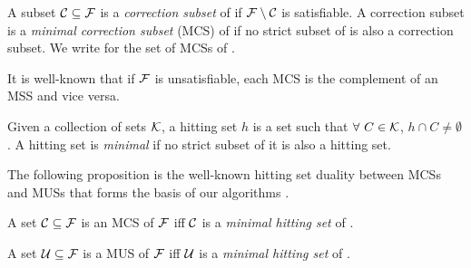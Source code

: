 \begin{definition}
    A subset $\mathcal{C} \subseteq \mathcal{F} $ is a \emph{correction subset} of \formula if $\mathcal{F} \setminus\mathcal{C}$ is satisfiable. 
    A correction subset  is a \emph{minimal correction subset} (MCS)  of \formula if no strict subset of  is also a correction subset. 
    We write \mcses{\F} for the set of MCSs of \F. 
\end{definition}

It is well-known that if $\mathcal{F} $ is unsatisfiable, each  MCS is the complement of an MSS and vice versa. 

\begin{definition}\label{def:minimal-hs}
    Given a collection of sets $\mathcal{K}$, a hitting set $h$ is a set such that $\forall \ C \in \mathcal{K}$, $h \cap C \neq \emptyset$. A hitting set is \emph{minimal} if no strict subset of it is also a hitting set. 
\end{definition}



The following proposition is the well-known hitting set duality  between MCSs and MUSs that forms the basis of our algorithms \cite{DBLP:journals/jar/LiffitonS08,ai/Reiter87}.

\begin{proposition}\label{prop:MCS-MUS-hittingset}
%     
    A set  $\mathcal{C} \subseteq \mathcal{F} $ is an MCS of $ \mathcal{F} $ iff  $\mathcal{C}$ is a \emph{minimal hitting set} of .

    A set  $\mathcal{U} \subseteq \mathcal{F} $ is a MUS of $ \mathcal{F} $ iff  $\mathcal{U}$ is a \emph{minimal hitting set} of .
\end{proposition}
 
